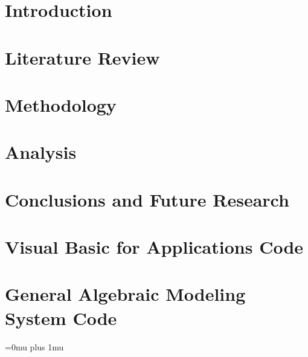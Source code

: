 \documentclass[12pt,letterpaper,oneside]{book}
\begin{document}

\mainmatter


 \chapter{Introduction}\label{ch1}
  

\chapter{Literature Review}\label{ch2}
 

  \chapter{Methodology}\label{ch3}
   

 \chapter{Analysis}\label{ch4}
  

 \chapter{Conclusions and Future Research}\label{ch5}
  

\appendix
	\chapter{Visual Basic for Applications Code}\label{A01_VBA}
		
	\chapter{General Algebraic Modeling System Code}\label{A02_GAMS}
		

\backmatter
	\singlespace
    \Urlmuskip=0mu plus 1mu\relax
    \raggedright

	 
	\clearpage
    \pagebreak

    
\end{document}
